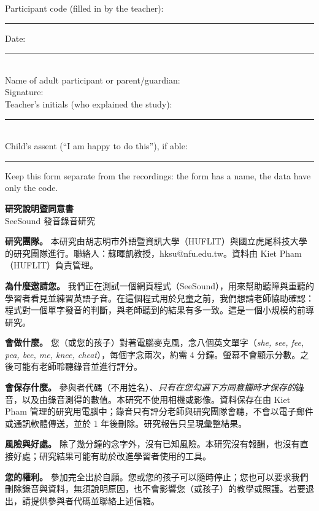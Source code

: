 \documentclass[11pt,a4paper]{article}
\begin{document}
\vspace{6pt}
\newcommand{\line}[2]{\noindent #1 \hrulefill\hspace{1em}#2 \rule{4cm}{0.4pt}\\[12pt]}
\noindent Participant code (filled in by the teacher): \rule{3.5cm}{0.4pt}\hfill Date: \rule{4cm}{0.4pt}\\[12pt]
\noindent Name of adult participant or parent/guardian: \hrulefill\\[12pt]
\noindent Signature: \hrulefill\\[12pt]
\noindent Teacher's initials (who explained the study): \rule{3cm}{0.4pt}\\[12pt]
\noindent Child's assent (``I am happy to do this''), if able: \rule{4cm}{0.4pt}

\vspace{4pt}\footnotesize Keep this form separate from the recordings: the form has a name, the data have only the code.

\newpage
\begin{center}{\Large\bfseries 研究說明暨同意書}\\[2pt]
SeeSound 發音錄音研究\end{center}

\textbf{研究團隊。} 本研究由胡志明市外語暨資訊大學（HUFLIT）與國立虎尾科技大學的研究團隊進行。聯絡人：蘇暉凱教授，hksu@nfu.edu.tw。資料由 Kiet Pham（HUFLIT）負責管理。

\textbf{為什麼邀請您。} 我們正在測試一個網頁程式（SeeSound），用來幫助聽障與重聽的學習者看見並練習英語子音。在這個程式用於兒童之前，我們想請老師協助確認：程式對一個單字發音的判斷，與老師聽到的結果有多一致。這是一個小規模的前導研究。

\textbf{會做什麼。} 您（或您的孩子）對著電腦麥克風，念八個英文單字（\textit{she, see, fee, pea, bee, me, knee, cheat}），每個字念兩次，約需 4 分鐘。螢幕不會顯示分數。之後可能有老師聆聽錄音並進行評分。

\textbf{會保存什麼。} 參與者代碼（不用姓名）、\textit{只有在您勾選下方同意欄時才保存的}錄音，以及由錄音測得的數值。本研究不使用相機或影像。資料保存在由 Kiet Pham 管理的研究用電腦中；錄音只有評分老師與研究團隊會聽，不會以電子郵件或通訊軟體傳送，並於 1 年後刪除。研究報告只呈現彙整結果。

\textbf{風險與好處。} 除了幾分鐘的念字外，沒有已知風險。本研究沒有報酬，也沒有直接好處；研究結果可能有助於改進學習者使用的工具。

\textbf{您的權利。} 參加完全出於自願。您或您的孩子可以隨時停止；您也可以要求我們刪除錄音與資料，無須說明原因，也不會影響您（或孩子）的教學或照護。若要退出，請提供參與者代碼並聯絡上述信箱。
\end{document}
